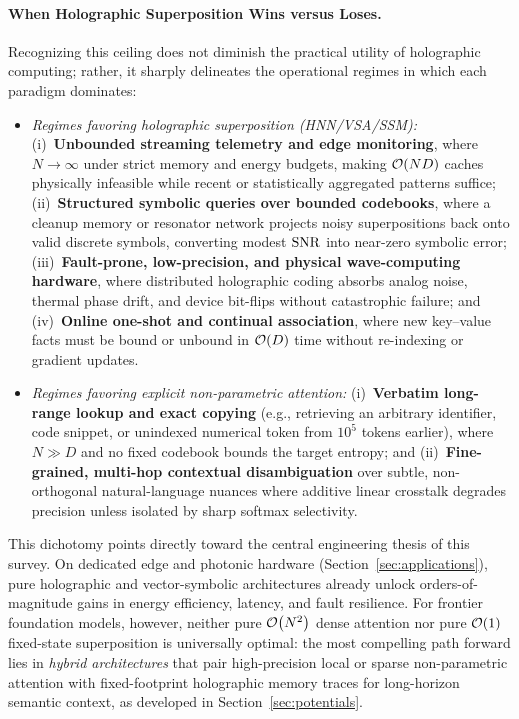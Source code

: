 \paragraph{When Holographic Superposition Wins versus Loses.}
Recognizing this ceiling does not diminish the practical utility of holographic computing; rather, it sharply delineates the operational regimes in which each paradigm dominates:

\begin{itemize}
    \item \emph{Regimes favoring holographic superposition (HNN/VSA/SSM):}
    (i)~\textbf{Unbounded streaming telemetry and edge monitoring}, where $N \to \infty$ under strict memory and energy budgets, making $\mathcal{O}\!\left(ND\right)$ caches physically infeasible while recent or statistically aggregated patterns suffice;
    (ii)~\textbf{Structured symbolic queries over bounded codebooks}, where a cleanup memory or resonator network projects noisy superpositions back onto valid discrete symbols, converting modest $\mathrm{SNR}$ into near-zero symbolic error;
    (iii)~\textbf{Fault-prone, low-precision, and physical wave-computing hardware}, where distributed holographic coding absorbs analog noise, thermal phase drift, and device bit-flips without catastrophic failure; and
    (iv)~\textbf{Online one-shot and continual association}, where new key--value facts must be bound or unbound in $\mathcal{O}\!\left(D\right)$ time without re-indexing or gradient updates.
    \item \emph{Regimes favoring explicit non-parametric attention:}
    (i)~\textbf{Verbatim long-range lookup and exact copying} (e.g., retrieving an arbitrary identifier, code snippet, or unindexed numerical token from $10^5$ tokens earlier), where $N \gg D$ and no fixed codebook bounds the target entropy; and
    (ii)~\textbf{Fine-grained, multi-hop contextual disambiguation} over subtle, non-orthogonal natural-language nuances where additive linear crosstalk degrades precision unless isolated by sharp softmax selectivity.
\end{itemize}

This dichotomy points directly toward the central engineering thesis of this survey.
On dedicated edge and photonic hardware (Section~\ref{sec:applications}), pure holographic and vector-symbolic architectures already unlock orders-of-magnitude gains in energy efficiency, latency, and fault resilience.
For frontier foundation models, however, neither pure $\mathcal{O}\!\left(N^2\right)$ dense attention nor pure $\mathcal{O}\!\left(1\right)$ fixed-state superposition is universally optimal: the most compelling path forward lies in \emph{hybrid architectures} that pair high-precision local or sparse non-parametric attention with fixed-footprint holographic memory traces for long-horizon semantic context, as developed in Section~\ref{sec:potentials}.

